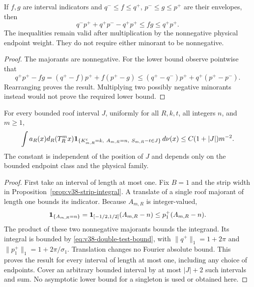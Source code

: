 \begin{lemma}
\label{lem:v38-product-envelopes}
If $f,g$ are interval indicators and $q^-\le f\le q^+$,
$p^-\le g\le p^+$ are their envelopes, then
\begin{equation}\label{eq:v38-product-envelope}
 q^-p^++q^+p^- -q^+p^+\le fg\le q^+p^+.
\end{equation}
The inequalities remain valid after multiplication by the nonnegative
physical endpoint weight. They do not require either minorant to be
nonnegative.
\end{lemma}
\begin{proof}
The majorants are nonnegative. For the lower bound observe pointwise
that
\[
 q^+p^+-fg=(q^+-f)p^++f(p^+-g)
       \le(q^+-q^-)p^++q^+(p^+-p^-).
\]
Rearranging proves the result. Multiplying two possibly negative
minorants instead would not prove the required lower bound.
\end{proof}

\begin{theorem}
\label{thm:v38-singleton-concentration}
For every bounded roof interval $J$, uniformly for all $R,k,t$, all
integers $n$, and $m\ge1$,
\begin{equation}\label{eq:v38-singleton-concentration}
 \int a_R(x)d_R(T_R^mx)
 \one_{\{K^{\rm c}_{m,R}=k,\ A_{m,R}=n,\ S_{m,R}-t\in J\}}\,d\nu(x)
       \le C(1+|J|)m^{-2}.
\end{equation}
The constant is independent of the position of $J$ and depends only
on the bounded endpoint class and the physical family.
\end{theorem}
\begin{proof}
First take an interval of length at most one. Fix $B=1$ and the strip
width in Proposition~\ref{prop:v38-strip-integral}. A translate of a
single roof majorant of length one bounds its indicator. Because
$A_{m,R}$ is integer-valued,
\[
 \mathbf1_{\{A_{m,R}=n\}}=\mathbf1_{[-1/2,1/2]}(A_{m,R}-n)
       \le p_1^+(A_{m,R}-n).
\]
The product of these two nonnegative majorants bounds the integrand.
Its integral is bounded by \eqref{eq:v38-double-test-bound}, with
$\|q^+\|_1=1+2\pi$ and $\|p_1^+\|_1=1+2\pi/\sigma_1$.
Translation changes no Fourier absolute bound. This proves the result
for every interval of length at most one, including any choice of
endpoints. Cover an arbitrary bounded interval by at most $|J|+2$
such intervals and sum. No asymptotic lower bound for a singleton is
used or obtained here.
\end{proof}

